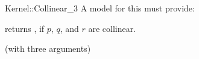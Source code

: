 \begin{ccRefFunctionObjectConcept}{Kernel::Collinear_3}
A model for this must provide:


{returns , if $p$, $q$, and $r$ are collinear.}

\ccRefines
{} (with three arguments)

\ccSeeAlso
{}  \\

\end{ccRefFunctionObjectConcept}
